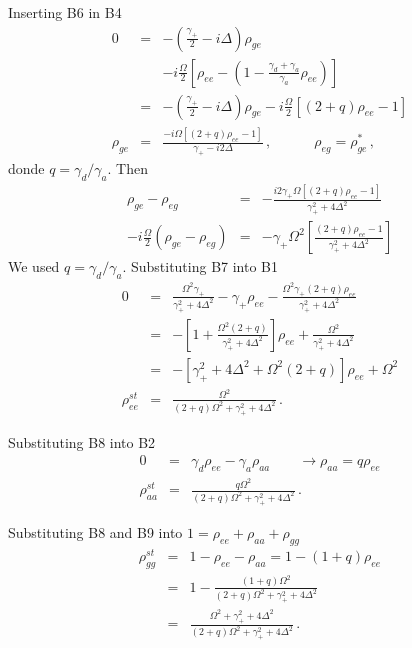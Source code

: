 \documentclass[twocolumn,aps,eqsecnum,showkeys,amsmath]{revtex4-2}
\begin{document}
Inserting B6 in B4
%
\begin{eqnarray*}
0 &=& -\left( \frac{\gamma_+}{2} -i\Delta \right) \rho_{ge} \\
    && -i\frac{\Omega}{2} \left[ \rho_{ee} 
    -\left( 1- \frac{\gamma_d +\gamma_a}{\gamma_a}  \rho_{ee} \right)
    \right]     \\
&=& -\left( \frac{\gamma_+}{2} -i\Delta \right) \rho_{ge} 
    -i\frac{\Omega}{2} \left[  (2+q) \rho_{ee} -1 \right]     \\ 
\rho_{ge} &=& 
   \frac{ -i\Omega \left[ (2+q) \rho_{ee} -1 \right]}{\gamma_+ -i2\Delta} \,,    
       \qquad \quad \rho_{eg} = \rho_{ge}^{\ast}   \,,
\end{eqnarray*}
donde $q= \gamma_d /\gamma_a$. Then
%
\begin{eqnarray}
\rho_{ge} -\rho_{eg} &=& 
	- \frac{ i 2\gamma_+ \Omega \left[ (2+q) \rho_{ee} -1 \right]}
       {\gamma_+^2 +4\Delta^2}     	\nonumber \\
-i \frac{\Omega}{2} \left( \rho_{ge} -\rho_{eg} \right) 
&=& - \gamma_+ \Omega^2  \left[ \frac{ (2+q) \rho_{ee} -1 }
       {\gamma_+^2 +4\Delta^2} \right]     
\end{eqnarray}
We used $q=\gamma_d/\gamma_a$. Substituting B7 into B1 
%
\begin{eqnarray}
0 &=& \frac{ \Omega^2 \gamma_+}{\gamma_+^2 +4\Delta^2} 
       -\gamma_+ \rho_{ee}     
- \frac{ \Omega^2 \gamma_+ (2+q) \rho_{ee} }
       {\gamma_+^2 +4\Delta^2}      \nonumber  \\ 
&=& -\left[ 1+  \frac{ \Omega^2 (2+q) }
       {\gamma_+^2 +4\Delta^2} \right] \rho_{ee} 
	+\frac{ \Omega^2 }{\gamma_+^2 +4\Delta^2}    \nonumber  \\
&=& -\left[ \gamma_+^2 +4\Delta^2 +\Omega^2 (2+q) 
    \right] \rho_{ee} +\Omega^2 		 \nonumber \\
\rho_{ee}^{st} &=& \frac{\Omega^2}{ (2+q) \Omega^2  
    +\gamma_+^2 +4\Delta^2 } 	\,.
\end{eqnarray}

Substituting B8 into B2 
%
\begin{eqnarray} 
0 &=& \gamma_d \rho_{ee} -\gamma_a \rho_{aa} 
    \qquad \to \rho_{aa} =q \rho_{ee}   \nonumber  \\
\rho_{aa}^{st} &=& 
	\frac{q\Omega^2}{ (2+q) \Omega^2  +\gamma_+^2 +4\Delta^2 } \,.
\end{eqnarray}

Substituting B8 and B9 into $1=\rho_{ee} +\rho_{aa} +\rho_{gg}$
%
\begin{eqnarray} 
\rho_{gg}^{st} &=& 1- \rho_{ee} -\rho_{aa} = 1-(1+q) \rho_{ee}     
    \nonumber     \\
&=& 1- \frac{ (1+q) \Omega^2}{ (2+q) \Omega^2  
    +\gamma_+^2 +4\Delta^2 }     \nonumber \\
&=& \frac{ \Omega^2 +\gamma_+^2 +4\Delta^2 }
    { (2+q) \Omega^2 +\gamma_+^2 +4\Delta^2 } 	\,.
\end{eqnarray}
\end{document}
